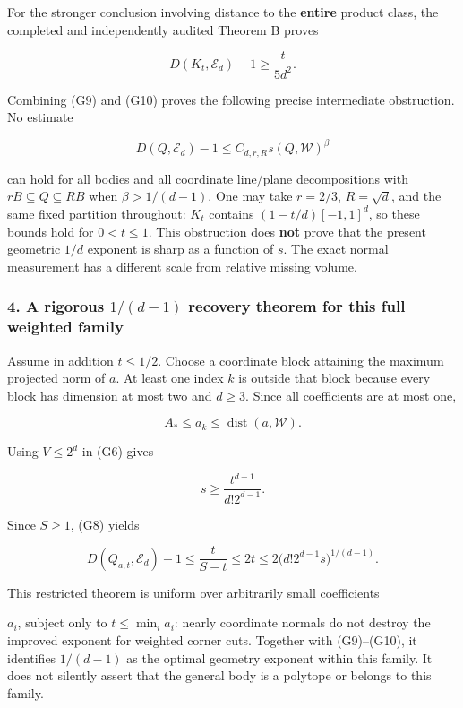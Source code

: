 \documentclass[
  11pt,
]{article}
\begin{document}
For the stronger conclusion involving distance to the \textbf{entire}
product class, the completed and independently audited Theorem B proves

\[
D(K_t,\mathcal E_d)-1\ge\frac{t}{5d^2}.                    \tag{G10}
\]

Combining (G9) and (G10) proves the following precise intermediate
obstruction. No estimate

\[
D(Q,\mathcal E_d)-1\le C_{d,r,R}s(Q,\mathcal W)^\beta
\]

can hold for all bodies and all coordinate line/plane decompositions
with \(rB\subseteq Q\subseteq RB\) when \(\beta>1/(d-1)\). One may take
\(r=2/3\), \(R=\sqrt d\), and the same fixed partition throughout:
\(K_t\) contains \((1-t/d)[-1,1]^d\), so these bounds hold for
\(0<t\le1\). This obstruction does \textbf{not} prove that the present
geometric \(1/d\) exponent is sharp as a function of \(s\). The exact
normal measurement has a different scale from relative missing volume.

\subsubsection{\texorpdfstring{4. A rigorous \(1/(d-1)\) recovery
theorem for this full weighted
family}{4. A rigorous 1/(d-1) recovery theorem for this full weighted family}}\label{a-rigorous-1d-1-recovery-theorem-for-this-full-weighted-family}

Assume in addition \(t\le1/2\). Choose a coordinate block attaining the
maximum projected norm of \(a\). At least one index \(k\) is outside
that block because every block has dimension at most two and \(d\ge3\).
Since all coefficients are at most one,

\[
A_*\le a_k\le\operatorname{dist}(a,\mathcal W).
\]

Using \(V\le2^d\) in (G6) gives

\[
s\ge\frac{t^{d-1}}{d!2^{d-1}}.
\]

Since \(S\ge1\), (G8) yields

\[
D(Q_{a,t},\mathcal E_d)-1
\le\frac{t}{S-t}\le2t
\le\boxed{2\bigl(d!2^{d-1}s\bigr)^{1/(d-1)}}.             \tag{G11}
\]

This restricted theorem is uniform over arbitrarily small coefficients

\(a_i\), subject only to \(t\le\min_i a_i\): nearly coordinate normals
do not destroy the improved exponent for weighted corner cuts. Together
with (G9)--(G10), it identifies \(1/(d-1)\) as the optimal geometry
exponent within this family. It does not silently assert that the
general body is a polytope or belongs to this family.
\end{document}

